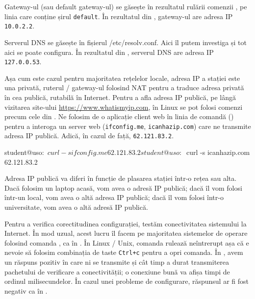 Gateway-ul (sau default gateway-ul) se găsește în rezultatul rulării comenzii , pe linia care conține șirul \texttt{default}.
În rezultatul din , gateway-ul are adresa IP \texttt{10.0.2.2}.

Serverul DNS se găsește în fișierul /etc/resolv.conf.
Aici îl putem investiga și tot aici se poate configura.
În rezultatul din , serverul DNS are adresa IP \texttt{127.0.0.53}.

Așa cum este cazul pentru majoritatea rețelelor locale, adresa IP a stației este una privată, ruterul / gateway-ul folosind NAT pentru a traduce adresa privată în cea publică, rutabilă în Internet.
Pentru a afla adresa IP publică, pe lângă vizitarea site-ului \url{https://www.whatismyip.com}, în Linux se pot folosi comenzi precum cele din .
Ne folosim de o aplicație client web în linia de comandă () pentru a interoga un server web (\texttt{ifconfig.me}, \texttt{icanhazip.com}) care ne transmite adresa IP publică. Adică, în cazul de față, \texttt{62.121.83.2}.

\begin{screen}[caption={Aflarea adresei IP publice în linia de comandă},label={lst:net:show-public-address}]
student@uso:~$ curl -s ifconfig.me
62.121.83.2
student@uso:~$ curl -s icanhazip.com
62.121.83.2
\end{screen}

Adresa IP publică va diferi în funcție de plasarea stației într-o rețea sau alta.
Dacă folosim un laptop acasă, vom avea o adresă IP publică; dacă îl vom folosi într-un local, vom avea o altă adresa IP publică; dacă îl vom folosi într-o universitate, vom avea o altă adresă IP publică.

Pentru a verifica corectitudinea configurației, testăm conectivitatea sistemului la Internet.
În mod uzual, acest lucru îl facem pe majoritatea sistemelor de operare folosind comanda , ca în .
În Linux / Unix, comanda  rulează neîntrerupt așa că e nevoie să folosim combinația de taste \texttt{Ctrl+c} pentru a opri comanda.
În , avem un răspuns pozitiv în care ni se transmite și cât timp a durat transmiterea pachetului de verificare a conectivității; o conexiune bună va afișa timpi de ordinul milisecundelor.
În cazul unei probleme de configurare, răspunsul ar fi fost negativ ca în .

